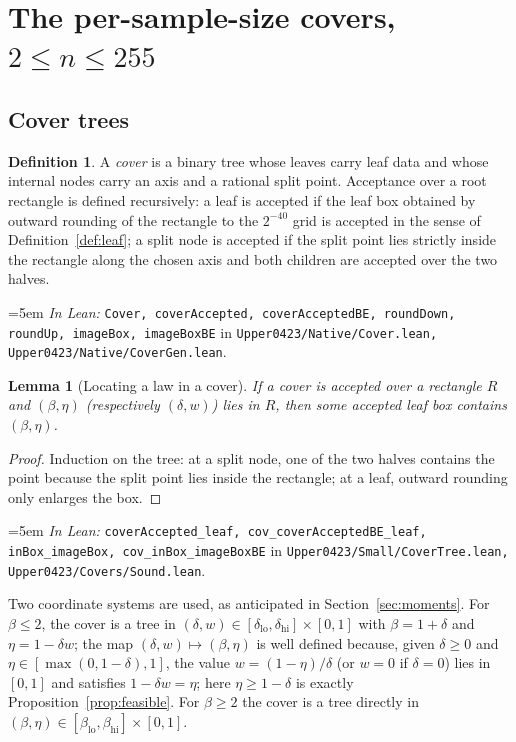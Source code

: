 \documentclass[11pt,a4paper]{article}
\newtheorem{lemma}[theorem]{Lemma}
\theoremstyle{definition}
\newtheorem{definition}[theorem]{Definition}
\newcommand{\Lean}[1]{\texttt{#1}}
\newcommand{\file}[1]{\texttt{#1}}
\newcommand{\formal}[2]{%
  \par\smallskip
  \begingroup\small\raggedright\emergencystretch=5em
  \noindent\textit{In Lean:} \Lean{#1} in \file{#2}.\par
  \endgroup\smallskip}
\begin{document}
\section{The per-sample-size covers, $2\le n\le255$}
\label{sec:covers}

\subsection{Cover trees}

\begin{definition}
  \label{def:cover}
  A \emph{cover} is a binary tree whose leaves carry leaf data and whose internal
  nodes carry an axis and a rational split point. Acceptance over a root
  rectangle is defined recursively: a leaf is accepted if the leaf box obtained
  by outward rounding of the rectangle to the $2^{-40}$ grid is accepted in the
  sense of Definition~\ref{def:leaf}; a split node is accepted if the split point
  lies strictly inside the rectangle along the chosen axis and both children are
  accepted over the two halves.
\end{definition}
\formal{Cover, coverAccepted, coverAcceptedBE, roundDown, roundUp, imageBox, imageBoxBE}{Upper0423/Native/Cover.lean, Upper0423/Native/CoverGen.lean}

\begin{lemma}[Locating a law in a cover]
  \label{lem:locate}
  If a cover is accepted over a rectangle $R$ and $(\beta,\eta)$ (respectively
  $(\delta,w)$) lies in $R$, then some accepted leaf box contains
  $(\beta,\eta)$.
\end{lemma}
\begin{proof}
  Induction on the tree: at a split node, one of the two halves contains the
  point because the split point lies inside the rectangle; at a leaf, outward
  rounding only enlarges the box.
\end{proof}
\formal{coverAccepted\_leaf, cov\_coverAcceptedBE\_leaf, inBox\_imageBox, cov\_inBox\_imageBoxBE}{Upper0423/Small/CoverTree.lean, Upper0423/Covers/Sound.lean}

Two coordinate systems are used, as anticipated in Section~\ref{sec:moments}.
For $\beta\le2$, the cover is a tree in $(\delta,w)\in[\delta_{\mathrm{lo}},
\delta_{\mathrm{hi}}]\times[0,1]$ with $\beta=1+\delta$ and $\eta=1-\delta w$;
the map $(\delta,w)\mapsto(\beta,\eta)$ is well defined because, given
$\delta\ge0$ and $\eta\in[\max(0,1-\delta),1]$, the value
$w=(1-\eta)/\delta$ (or $w=0$ if $\delta=0$) lies in $[0,1]$ and satisfies
$1-\delta w=\eta$; here $\eta\ge1-\delta$ is exactly
Proposition~\ref{prop:feasible}. For $\beta\ge2$ the cover is a tree directly in
$(\beta,\eta)\in[\beta_{\mathrm{lo}},\beta_{\mathrm{hi}}]\times[0,1]$.
\end{document}
